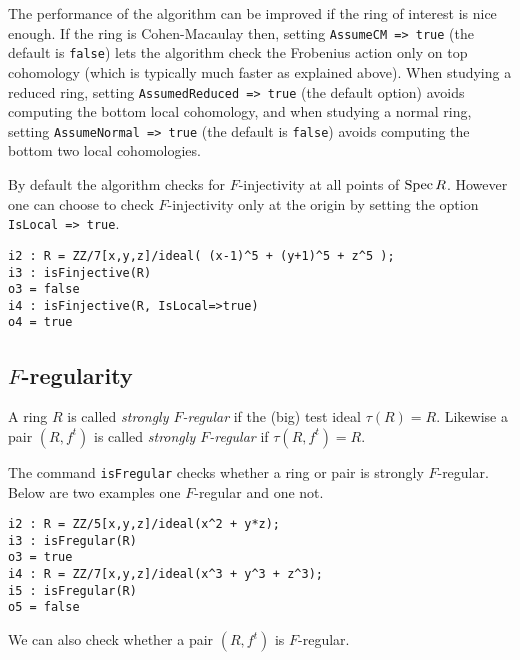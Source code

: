 \documentclass[11pt]{amsart}
\begin{document}
The performance of the algorithm can be improved if the ring of interest is
nice enough. If the ring is Cohen-Macaulay then, setting \texttt{AssumeCM =>
true} (the default is \texttt{false}) lets the algorithm check the Frobenius action only on top cohomology
(which is typically much faster as explained above).
When studying a reduced ring,  setting \texttt{AssumedReduced => true} (the default option) avoids
computing the bottom local cohomology, and when studying a normal ring, setting
\texttt{AssumeNormal => true} (the default is \texttt{false}) avoids computing the bottom two local
cohomologies. 

By default the algorithm checks for $F$-injectivity at all points of $\operatorname{{Spec}} R$.  However one
can choose to check $F$-injectivity only at the origin by setting the
option \texttt{IsLocal => true}.

\begin{verbatim}
i2 : R = ZZ/7[x,y,z]/ideal( (x-1)^5 + (y+1)^5 + z^5 );
i3 : isFinjective(R)
o3 = false
i4 : isFinjective(R, IsLocal=>true)
o4 = true
\end{verbatim}

\subsection{$F$-regularity}

\begin{definition}
A ring $R$ is called \emph{strongly $F$-regular} if the (big) test ideal $\tau(R) = R$.  Likewise a pair $(R, f^t)$ is called \emph{strongly $F$-regular} if $\tau(R, f^t) = R$.
\end{definition}


The command \texttt{isFregular} checks whether a ring or pair is strongly
$F$-regular. Below are two examples one $F$-regular and one not.


\begin{verbatim}
i2 : R = ZZ/5[x,y,z]/ideal(x^2 + y*z);
i3 : isFregular(R)
o3 = true
i4 : R = ZZ/7[x,y,z]/ideal(x^3 + y^3 + z^3);
i5 : isFregular(R)
o5 = false
\end{verbatim}

We can also check whether a pair $(R, f^t)$ is $F$-regular.
\end{document}
